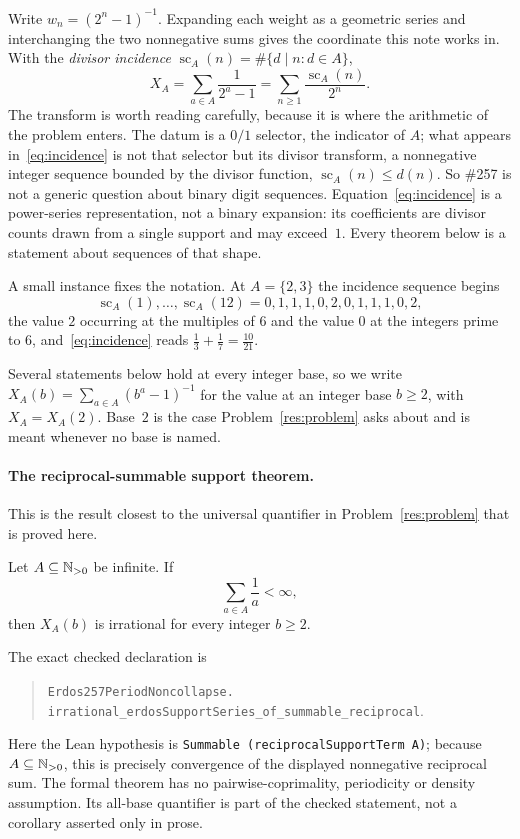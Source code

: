 \documentclass[11pt]{article}
\newcommand{\wgt}[1]{w_{#1}}
\newcommand{\scA}{\operatorname{sc}}
\begin{document}
Write
$\wgt n=(2^n-1)^{-1}$.  Expanding each weight as a geometric series and
interchanging the two nonnegative sums gives the coordinate this note works
in.  With the \emph{divisor incidence}
$\scA_A(n)=\#\{d\mid n: d\in A\}$,
\[
  X_A=\sum_{a\in A}\frac1{2^a-1}=\sum_{n\ge1}\frac{\scA_A(n)}{2^n}.
  \tag{1}\label{eq:incidence}
\]
The transform is worth reading carefully, because it is where the arithmetic
of the problem enters.  The datum is a $0/1$ selector, the indicator of $A$;
what appears in~\eqref{eq:incidence} is not that selector but its divisor
transform, a nonnegative integer sequence bounded by the divisor function,
$\scA_A(n)\le d(n)$.  So \#257 is not a generic question about binary digit
sequences.  Equation~\eqref{eq:incidence} is a power-series representation,
not a binary expansion: its coefficients are divisor counts drawn from a
single support and may exceed~$1$.  Every theorem below is a statement about
sequences of that shape.

A small instance fixes the notation.  At $A=\{2,3\}$ the incidence sequence
begins
\[
  \scA_A(1),\dots,\scA_A(12)=0,1,1,1,0,2,0,1,1,1,0,2,
\]
the value $2$ occurring at the multiples of $6$ and the value $0$ at the
integers prime to $6$, and~\eqref{eq:incidence} reads
$\tfrac13+\tfrac17=\tfrac{10}{21}$.

Several statements below hold at every integer base, so we write
$X_A(b)=\sum_{a\in A}(b^a-1)^{-1}$ for the value at an integer base $b\ge2$,
with $X_A=X_A(2)$.  Base~$2$ is the case Problem~\ref{res:problem} asks about
and is meant whenever no base is named.

\paragraph{The reciprocal-summable support theorem.}
This is the result closest to the universal quantifier in
Problem~\ref{res:problem} that is proved here.

\begin{theorem}\label{res:reciprocal-support}
Let $A\subseteq\mathbb{N}_{>0}$ be infinite.  If
\[
  \sum_{a\in A}\frac1a<\infty,
\]
then \(X_A(b)\) is irrational for every integer \(b\ge2\).
\end{theorem}

\noindent The exact checked declaration is
\begin{quote}\small
\texttt{Erdos257PeriodNoncollapse.}\\
\texttt{irrational\_erdosSupportSeries\_of\_summable\_reciprocal}.
\end{quote}
Here the Lean hypothesis is
\texttt{Summable (reciprocalSupportTerm A)}; because $A\subseteq\mathbb{N}_{>0}$,
this is precisely convergence of the displayed nonnegative reciprocal sum.
The formal theorem has no pairwise-coprimality, periodicity or density
assumption.  Its all-base quantifier is part of the checked statement, not a
corollary asserted only in prose.
\end{document}
